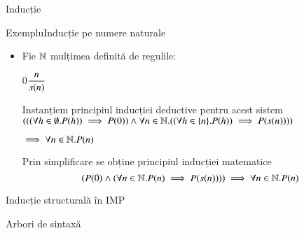 \documentclass[xcolor=pdftex,romanian,colorlinks]{beamer}
\begin{document}
\begin{section}{Inducție}
%
%
%

\begin{frame}{Exemplu}{Inducție pe numere naturale}

\begin{itemize}
\item Fie $\mathbb{N}$ mulțimea definită de regulile:

\hfill $0$\hfill $\displaystyle\reg{s(n)}{n}{}$\hfill\;

\vitem Instanțiem principiul inducției deductive pentru acest sistem
$(((\forall h\in\emptyset.P(h)) \implies P(0))\wedge\forall n\in\mathbb{N}.((\forall h\in\{n\}.P(h)) \implies P(s(n))))$

\hfill $\implies \forall n\in\mathbb{N}.P(n)$

\vitem Prin simplificare se obține principiul inducției matematice
\[\left(P(0) \wedge (\forall n\in\mathbb{N}. P(n) \implies P(s(n)))\right)\implies \forall n\in\mathbb{N}. P(n)\]
\end{itemize}
\end{frame}

\begin{subsection}{Inducție structurală în IMP}

\begin{frame}{Arbori de sintaxă}


\end{frame}
\end{subsection}
\end{section}
\end{document}
